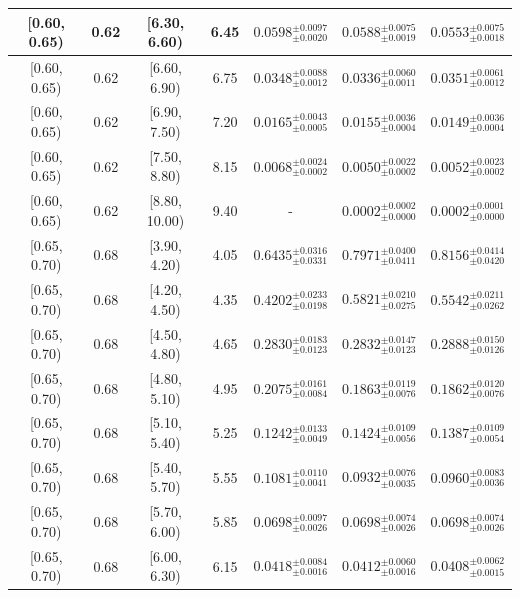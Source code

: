 \begin{longtable}{|c|c|c|c|c|c|c|}
[0.60, 0.65) & 0.62 & [6.30, 6.60) & 6.45 & $0.0598^{ \pm 0.0097 }_{ \pm 0.0020 }$ & $0.0588^{ \pm 0.0075 }_{ \pm 0.0019 }$ & $0.0553^{ \pm 0.0075 }_{ \pm 0.0018 }$ \\ 
\hline
[0.60, 0.65) & 0.62 & [6.60, 6.90) & 6.75 & $0.0348^{ \pm 0.0088 }_{ \pm 0.0012 }$ & $0.0336^{ \pm 0.0060 }_{ \pm 0.0011 }$ & $0.0351^{ \pm 0.0061 }_{ \pm 0.0012 }$ \\ 
\hline
[0.60, 0.65) & 0.62 & [6.90, 7.50) & 7.20 & $0.0165^{ \pm 0.0043 }_{ \pm 0.0005 }$ & $0.0155^{ \pm 0.0036 }_{ \pm 0.0004 }$ & $0.0149^{ \pm 0.0036 }_{ \pm 0.0004 }$ \\ 
\hline
[0.60, 0.65) & 0.62 & [7.50, 8.80) & 8.15 & $0.0068^{ \pm 0.0024 }_{ \pm 0.0002 }$ & $0.0050^{ \pm 0.0022 }_{ \pm 0.0002 }$ & $0.0052^{ \pm 0.0023 }_{ \pm 0.0002 }$ \\ 
\hline
[0.60, 0.65) & 0.62 & [8.80, 10.00) & 9.40 & - & $0.0002^{ \pm 0.0002 }_{ \pm 0.0000 }$ & $0.0002^{ \pm 0.0001 }_{ \pm 0.0000 }$ \\ 
\hline
[0.65, 0.70) & 0.68 & [3.90, 4.20) & 4.05 & $0.6435^{ \pm 0.0316 }_{ \pm 0.0331 }$ & $0.7971^{ \pm 0.0400 }_{ \pm 0.0411 }$ & $0.8156^{ \pm 0.0414 }_{ \pm 0.0420 }$ \\ 
\hline
[0.65, 0.70) & 0.68 & [4.20, 4.50) & 4.35 & $0.4202^{ \pm 0.0233 }_{ \pm 0.0198 }$ & $0.5821^{ \pm 0.0210 }_{ \pm 0.0275 }$ & $0.5542^{ \pm 0.0211 }_{ \pm 0.0262 }$ \\ 
\hline
[0.65, 0.70) & 0.68 & [4.50, 4.80) & 4.65 & $0.2830^{ \pm 0.0183 }_{ \pm 0.0123 }$ & $0.2832^{ \pm 0.0147 }_{ \pm 0.0123 }$ & $0.2888^{ \pm 0.0150 }_{ \pm 0.0126 }$ \\ 
\hline
[0.65, 0.70) & 0.68 & [4.80, 5.10) & 4.95 & $0.2075^{ \pm 0.0161 }_{ \pm 0.0084 }$ & $0.1863^{ \pm 0.0119 }_{ \pm 0.0076 }$ & $0.1862^{ \pm 0.0120 }_{ \pm 0.0076 }$ \\ 
\hline
[0.65, 0.70) & 0.68 & [5.10, 5.40) & 5.25 & $0.1242^{ \pm 0.0133 }_{ \pm 0.0049 }$ & $0.1424^{ \pm 0.0109 }_{ \pm 0.0056 }$ & $0.1387^{ \pm 0.0109 }_{ \pm 0.0054 }$ \\ 
\hline
[0.65, 0.70) & 0.68 & [5.40, 5.70) & 5.55 & $0.1081^{ \pm 0.0110 }_{ \pm 0.0041 }$ & $0.0932^{ \pm 0.0076 }_{ \pm 0.0035 }$ & $0.0960^{ \pm 0.0083 }_{ \pm 0.0036 }$ \\ 
\hline
[0.65, 0.70) & 0.68 & [5.70, 6.00) & 5.85 & $0.0698^{ \pm 0.0097 }_{ \pm 0.0026 }$ & $0.0698^{ \pm 0.0074 }_{ \pm 0.0026 }$ & $0.0698^{ \pm 0.0074 }_{ \pm 0.0026 }$ \\ 
\hline
[0.65, 0.70) & 0.68 & [6.00, 6.30) & 6.15 & $0.0418^{ \pm 0.0084 }_{ \pm 0.0016 }$ & $0.0412^{ \pm 0.0060 }_{ \pm 0.0016 }$ & $0.0408^{ \pm 0.0062 }_{ \pm 0.0015 }$ \\ 

\end{longtable}
